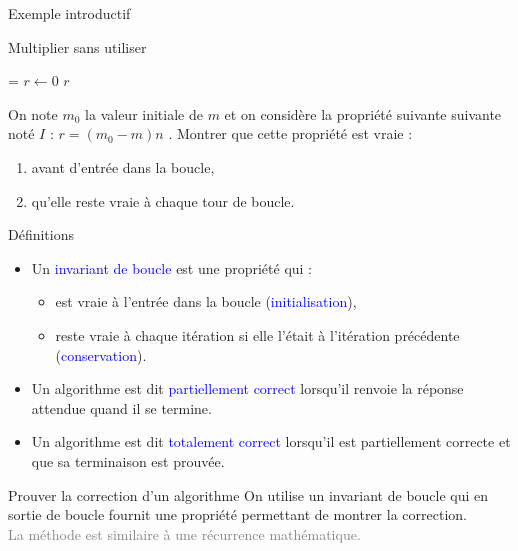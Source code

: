 \documentclass[10pt,french]{beamer}
\begin{document}
\begin{frame}[fragile]{\Ctitle}{\stitle}
	\begin{block}{Exemple introductif}
	\SetAlFnt{\small}
	\setlength{\algomargin}{8pt}
	\begin{algorithm}[H]
		\DontPrintSemicolon
		\caption{Multiplier sans utiliser {\tt *}}
		\everypar={\footnotesize \textcolor{gray}{\nl}}
		$r \leftarrow 0$\;
		\Return $r$
	  \end{algorithm}
	  On note $m_0$ la valeur initiale de $m$ et on considère la propriété suivante suivante noté $I$ : \og{} $r = (m_0-m)n$ \fg{}. Montrer que cette propriété est vraie :
	  \begin{enumerate}
	  \item<2-> avant d'entrée dans la boucle,
	  \item<3-> qu'elle reste vraie à chaque tour de boucle.
	  \end{enumerate}
	\end{block}
\end{frame}

\begin{frame}[fragile]{\Ctitle}{\stitle}
	\begin{block}{Définitions}
    \begin{itemize}
        \item<1-> Un \textcolor{blue}{invariant de boucle} est une propriété qui :
            \begin{itemize}
            \item<2-> est vraie à l'entrée dans la boucle (\textcolor{blue}{initialisation}),
            \item<3-> reste vraie à chaque itération si elle l'était à l'itération précédente (\textcolor{blue}{conservation}).
            \end{itemize}
		\item<4-> Un algorithme est dit \textcolor{blue}{partiellement correct} lorsqu'il renvoie la réponse attendue quand il se termine.
		\item<5-> Un algorithme est dit \textcolor{blue}{totalement correct} lorsqu'il est partiellement correcte et que sa terminaison est prouvée.
		\end{itemize}
	\end{block}
	{\begin{alertblock}{\textcolor{yellow}{\important \;} Prouver la correction d'un algorithme}
		On utilise un invariant de boucle qui en sortie de boucle fournit une propriété permettant de montrer la correction.\\
		\textcolor{gray}{La méthode est similaire à une récurrence mathématique.}
	\end{alertblock}}
\end{frame}
\end{document}

